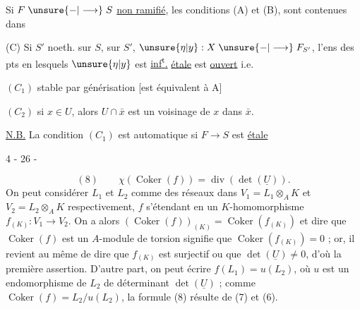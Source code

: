 

Si $F\mathrel{\unsure{-|\longrightarrow}}S$ \uline{non ramifié}, les conditions (A) et (B), sont  contenues dans

(C) Si $S'$ noeth. sur $S$,    sur $S'$, $\unsure{\eta|y}:X\mathrel{\unsure{-|\longrightarrow}}F_{S'}$, l'ens  des pts en lesquels $\unsure{\eta|y}$ est \uline{inf\textsuperscript{t}.} \uline{étale} est \uline{ouvert} i.e.

$(C_1)$ stable par générisation [est  équivalent à A]

$(C_2)$ si $x\in U$, alors  $U\cap\bar x$ est un voisinage de $x$ dans $\bar x$.

\uline{N.B.} La condition $(C_1)$ est automatique si $F\longrightarrow S$ est \uline{étale}
\begin{center}4 - 26 -\end{center}
\[
 (8)\qquad \chi(\operatorname{Coker}(f))=\operatorname{div}(\det(\underline{U})).
\]
On peut considérer $L_1$ et $L_2$ comme des réseaux dans $V_1=L_1\otimes_A K$ et $V_2=L_2\otimes_A K$ respectivement, $f$ s'étendant en un $K$-homomorphisme $f_{(K)}:V_1\longrightarrow V_2$. On a alors $(\operatorname{Coker}(f))_{(K)}=\operatorname{Coker}(f_{(K)})$ et dire que $\operatorname{Coker}(f)$ est un $A$-module de torsion signifie que $\operatorname{Coker}(f_{(K)})=0$ ; or, il revient au même de dire que $f_{(K)}$ est surjectif ou que $\det(\underline{U})\ne0$, d'où la première assertion. D'autre part, on peut écrire $f(L_1)=u(L_2)$, où $u$ est un endomorphisme de $L_2$ de déterminant $\det(\underline{U})$ ; comme $\operatorname{Coker}(f)=L_2/u(L_2)$, la formule (8) résulte de (7) et (6).

